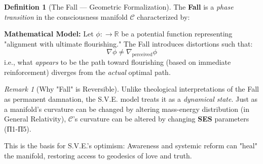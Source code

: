 \documentclass[11pt,a4paper]{article}
\newcommand{\SES}{\textbf{SES}}
\newcommand{\CC}{$\mathcal{C}$}
\newcommand{\Love}{$\mathcal{L}$}
\theoremstyle{definition}
\newtheorem{definition}{Definition}[section]
\theoremstyle{remark}
\newtheorem{remark}{Remark}[section]
\begin{document}
\begin{definition}[The Fall — Geometric Formalization]
\label{def:fall_geometric}
The \textbf{Fall} is a \textit{phase transition} in the consciousness manifold \CC{} characterized by:


\textbf{Mathematical Model:}
Let $\phi: \CC \to \mathbb{R}$ be a potential function representing "alignment with ultimate flourishing." The Fall introduces distortions such that:
\[
\nabla \phi \neq \nabla_{\text{perceived}} \phi
\]
i.e., what \textit{appears} to be the path toward flourishing (based on immediate reinforcement) diverges from the \textit{actual} optimal path.
\end{definition}

\begin{remark}[Why "Fall" is Reversible]
Unlike theological interpretations of the Fall as permanent damnation, the S.V.E. model treats it as a \textit{dynamical state}. Just as a manifold's curvature can be changed by altering mass-energy distribution (in General Relativity), \CC{}'s curvature can be altered by changing \SES{} parameters (П1-П5).

This is the basis for S.V.E.'s optimism: Awareness and systemic reform can "heal" the manifold, restoring access to geodesics of love and truth.
\end{remark}
\end{document}
